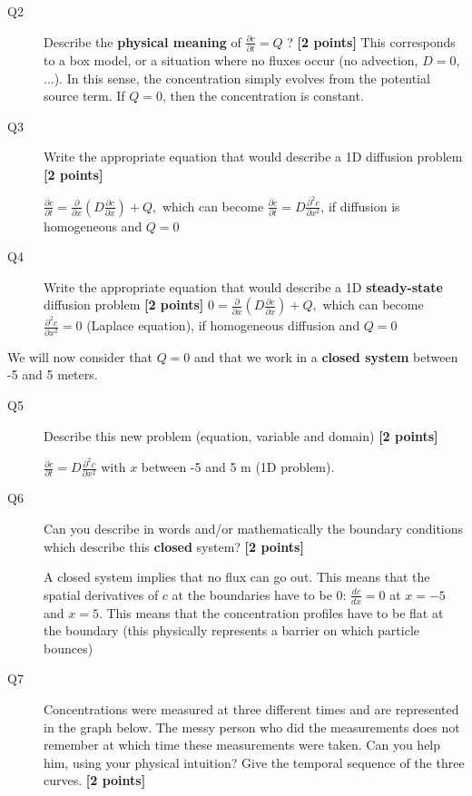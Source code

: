 \documentclass{article}
\newcommand{\ans}[1]{\textcolor{dark-green}{#1}}
\begin{document}
\begin{description}
\item [Q2] Describe the \textbf{physical meaning} of $ \frac{\partial c}{\partial t}  = Q$ ? \textbf{[2 points]}
\ans{This corresponds to a box model, or a situation where no fluxes occur (no advection, $D = 0$, ...). In this sense, the concentration simply evolves from the potential source term. If $Q = 0$, then the concentration is constant.}

\item [Q3] Write the appropriate equation that would describe a 1D diffusion problem \textbf{[2 points]}

\ans{$\frac{\partial c}{\partial t} = \frac{\partial}{\partial x} \left( D \frac{\partial c}{\partial x}  \right) + Q, $ which can become $\frac{\partial c}{\partial t} = D  \frac{\partial^2 c}{\partial x^2} $, if diffusion is homogeneous and $Q = 0$ }
\item [Q4] Write the appropriate equation that would describe a 1D \textbf{steady-state} diffusion problem \textbf{[2 points]}
\ans{$0 = \frac{\partial}{\partial x} \left( D \frac{\partial c}{\partial x}  \right) + Q, $ which can become $ \frac{\partial^2 c}{\partial x^2} = 0 $ (Laplace equation), if homogeneous diffusion and $Q = 0$ }
\end{description}

We will now consider that $Q=0$ and that we work in a \textbf{closed system} between -5 and 5 meters. 


\begin{description}
\item [Q5] Describe this new problem (equation, variable and domain) \textbf{[2 points]}

\ans{$\frac{\partial c}{\partial t} = D  \frac{\partial^2 c}{\partial x^2}   $ with $x$ between -5 and 5 m (1D problem). }


\item [Q6] Can you describe in words and/or mathematically the boundary conditions which describe this \textbf{closed} system? \textbf{[2 points]}

\ans{A closed system implies that no flux can go out. This means that the spatial derivatives of $c$ at the boundaries have to be 0: $\frac{dc}{dx} = 0$ at $x = -5$ and $x = 5$. This means that the concentration profiles have to be flat at the boundary (this physically represents a barrier on which particle bounces)}

\item [Q7] Concentrations were measured at three different times and are represented in the graph below. The messy person who did the measurements does not remember at which time these measurements were taken. Can you help him, using your physical intuition? Give the temporal sequence of the three curves.  \textbf{[2 points]}  

\end{description}
\end{document}

